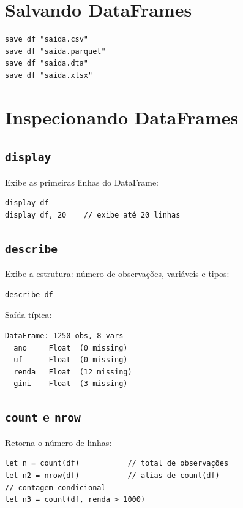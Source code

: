 \section{Salvando DataFrames}

\begin{lstlisting}
save df "saida.csv"
save df "saida.parquet"
save df "saida.dta"
save df "saida.xlsx"
\end{lstlisting}

\section{Inspecionando DataFrames}

\subsection*{\texttt{display}}

Exibe as primeiras linhas do DataFrame:

\begin{lstlisting}
display df
display df, 20    // exibe até 20 linhas
\end{lstlisting}

\subsection*{\texttt{describe}}

Exibe a estrutura: número de observações, variáveis e tipos:

\begin{lstlisting}
describe df
\end{lstlisting}

Saída típica:

\begin{lstlisting}[style=inline]
DataFrame: 1250 obs, 8 vars
  ano     Float  (0 missing)
  uf      Float  (0 missing)
  renda   Float  (12 missing)
  gini    Float  (3 missing)
\end{lstlisting}

\subsection*{\texttt{count} e \texttt{nrow}}

Retorna o número de linhas:

\begin{lstlisting}
let n = count(df)           // total de observações
let n2 = nrow(df)           // alias de count(df)
// contagem condicional
let n3 = count(df, renda > 1000)
\end{lstlisting}

